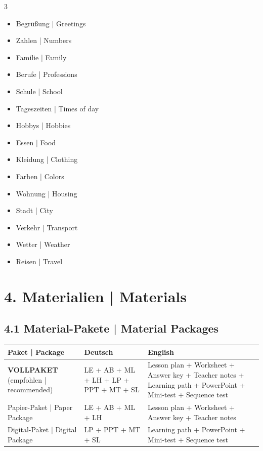 \documentclass[11pt,a4paper]{article}
\begin{document}
\begin{multicols}{3}
\begin{itemize}[leftmargin=*, nosep]
    \item[$\square$] Begrüßung | Greetings
    \item[$\square$] Zahlen | Numbers
    \item[$\square$] Familie | Family
    \item[$\square$] Berufe | Professions
    \item[$\square$] Schule | School
    \item[$\square$] Tageszeiten | Times of day
    \item[$\square$] Hobbys | Hobbies
    \item[$\square$] Essen | Food
    \item[$\square$] Kleidung | Clothing
    \item[$\square$] Farben | Colors
    \item[$\square$] Wohnung | Housing
    \item[$\square$] Stadt | City
    \item[$\square$] Verkehr | Transport
    \item[$\square$] Wetter | Weather
    \item[$\square$] Reisen | Travel
\end{itemize}
\end{multicols}

\newpage

\section*{\textcolor{spanisch}{4. Materialien | Materials}}

\subsection*{4.1 Material-Pakete | Material Packages}

\begin{tabularx}{\textwidth}{|l|X|X|}
\hline
\rowcolor{lightgray}
\textbf{Paket | Package} & \textbf{Deutsch} & \textbf{English} \\
\hline
\textbf{VOLLPAKET} (empfohlen | recommended) &
LE + AB + ML + LH + LP + PPT + MT + SL &
Lesson plan + Worksheet + Answer key + Teacher notes + Learning path + PowerPoint + Mini-test + Sequence test \\
\hline
Papier-Paket | Paper Package &
LE + AB + ML + LH &
Lesson plan + Worksheet + Answer key + Teacher notes \\
\hline
Digital-Paket | Digital Package &
LP + PPT + MT + SL &
Learning path + PowerPoint + Mini-test + Sequence test \\
\hline
\end{tabularx}
\end{document}
